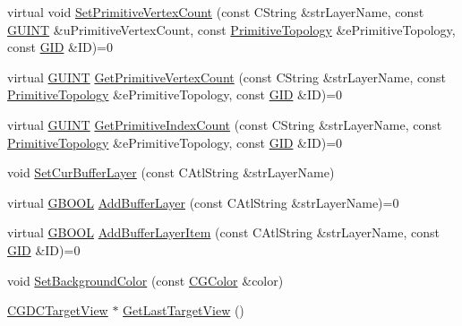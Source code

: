 \begin{DoxyCompactItemize}
\item 
virtual void \hyperlink{class_c_g_d_c_aae840ea27561dea2df658866c75aa501}{Set\+Primitive\+Vertex\+Count} (const C\+String \&str\+Layer\+Name, const \hyperlink{_g_types_8h_a415305cdf38fc38f67c037973e9a748c}{G\+U\+I\+N\+T} \&u\+Primitive\+Vertex\+Count, const \hyperlink{_g_types_8h_a940e3da6a9b57aae3de0b050e2a7af5e}{Primitive\+Topology} \&e\+Primitive\+Topology, const \hyperlink{_g_types_8h_a5b96ecb16d8e437977d12cd40aa6f6d8}{G\+I\+D} \&I\+D)=0
\item 
virtual \hyperlink{_g_types_8h_a415305cdf38fc38f67c037973e9a748c}{G\+U\+I\+N\+T} \hyperlink{class_c_g_d_c_a9b0c1ccc2be2d59a353aa70a54549547}{Get\+Primitive\+Vertex\+Count} (const C\+String \&str\+Layer\+Name, const \hyperlink{_g_types_8h_a940e3da6a9b57aae3de0b050e2a7af5e}{Primitive\+Topology} \&e\+Primitive\+Topology, const \hyperlink{_g_types_8h_a5b96ecb16d8e437977d12cd40aa6f6d8}{G\+I\+D} \&I\+D)=0
\item 
virtual \hyperlink{_g_types_8h_a415305cdf38fc38f67c037973e9a748c}{G\+U\+I\+N\+T} \hyperlink{class_c_g_d_c_a6258e3d5c100314c4faf96dcedac4195}{Get\+Primitive\+Index\+Count} (const C\+String \&str\+Layer\+Name, const \hyperlink{_g_types_8h_a940e3da6a9b57aae3de0b050e2a7af5e}{Primitive\+Topology} \&e\+Primitive\+Topology, const \hyperlink{_g_types_8h_a5b96ecb16d8e437977d12cd40aa6f6d8}{G\+I\+D} \&I\+D)=0
\item 
void \hyperlink{class_c_g_d_c_a804feb06f365d9b43f8e7ef00a5e781d}{Set\+Cur\+Buffer\+Layer} (const C\+Atl\+String \&str\+Layer\+Name)
\item 
virtual \hyperlink{_g_types_8h_a2901915743626352a6820c5405f556dc}{G\+B\+O\+O\+L} \hyperlink{class_c_g_d_c_a63eb18051fab5957058e88a5db032e9c}{Add\+Buffer\+Layer} (const C\+Atl\+String \&str\+Layer\+Name)=0
\item 
virtual \hyperlink{_g_types_8h_a2901915743626352a6820c5405f556dc}{G\+B\+O\+O\+L} \hyperlink{class_c_g_d_c_a6da923358188ef95fc039b737018c93b}{Add\+Buffer\+Layer\+Item} (const C\+Atl\+String \&str\+Layer\+Name, const \hyperlink{_g_types_8h_a5b96ecb16d8e437977d12cd40aa6f6d8}{G\+I\+D} \&I\+D)=0
\item 
void \hyperlink{class_c_g_d_c_aeaf729b17d48c6dc997a73fe5b13b747}{Set\+Background\+Color} (const \hyperlink{class_c_g_color}{C\+G\+Color} \&color)
\item 
\hyperlink{class_c_g_d_c_target_view}{C\+G\+D\+C\+Target\+View} $\ast$ \hyperlink{class_c_g_d_c_a675f09fe74274a1dd096cbb08c3ffdd4}{Get\+Last\+Target\+View} ()
\item 

\end{DoxyCompactItemize}
